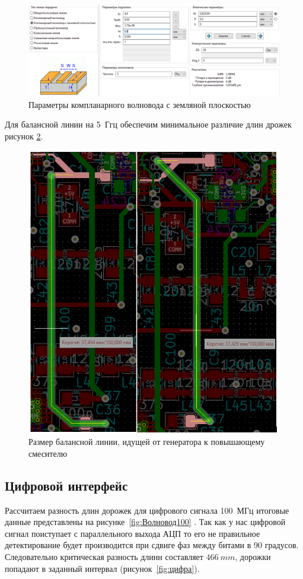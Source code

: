 \documentclass[utf8x, 14pt, oneside, a4paper]{article}
\begin{document}
			\begin{figure}[h!]
				\centering
				\includegraphics[width=0.9\linewidth]{Волновод}
				\caption{Параметры компланарного волновода с земляной плоскостью}
				\label{fig:волновод5}
			\end{figure}
			Для балансной линии на 5~Ггц обеспечим минимальное различие длин дрожек рисунок \ref{fig:Длинна}.
			\begin{figure}[h!]
				\centering
				\includegraphics[width=0.7\linewidth]{Длинна}
				\caption{Размер балансной линии, идущей от генератора к повышающему смесителю}
				\label{fig:Длинна}
			\end{figure}
			
		\subsection{Цифровой интерфейс}
		Рассчитаем разность длин дорожек для цифрового сигнала 100~МГц итоговые данные представлены на рисунке~\ref{fig:Волновод100} . Так как у нас цифровой сигнал поиступает с параллельного выхода АЦП то его не правильное детектирование будет производится при сдвиге фаз между битами в 90 градусов. Следовательно критическая разность длинн составляет $466~mm$, дорожки попадают в заданный интервал (рисунок~\ref{fig:цифра}).
		
\end{document}
